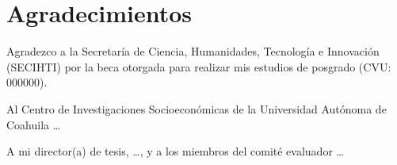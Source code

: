 \chapter*{Agradecimientos}

Agradezco a la Secretaría de Ciencia, Humanidades, Tecnología e Innovación
(SECIHTI) por la beca otorgada para realizar mis estudios de posgrado
(CVU: 000000).

Al Centro de Investigaciones Socioeconómicas de la Universidad Autónoma de
Coahuila \ldots

A mi director(a) de tesis, \ldots, y a los miembros del comité evaluador
\ldots
